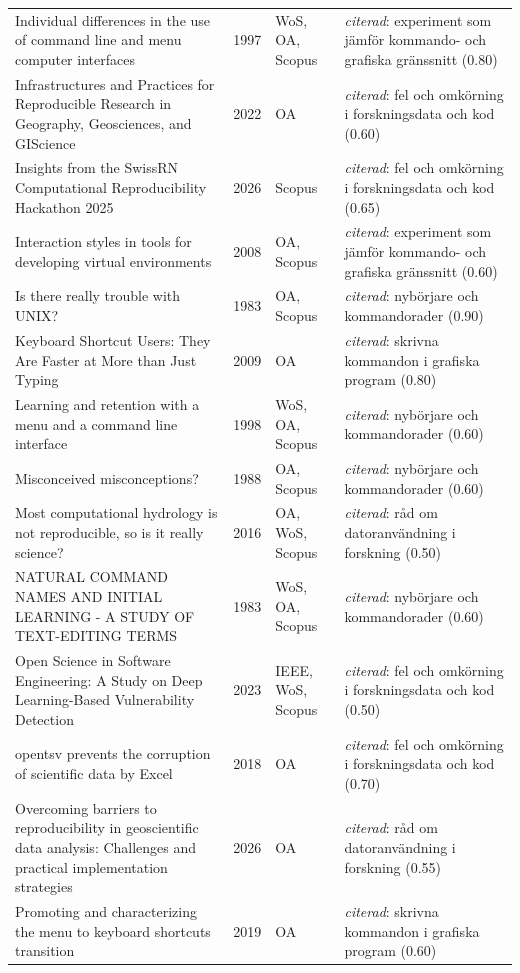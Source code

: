 \begin{longtable}{@{}%
  >{\raggedright\arraybackslash}p{}c%
  >{\raggedright\arraybackslash}p{}%
  >{\raggedright\arraybackslash}p{}@{}}
Individual differences in the use of command line and menu computer interfaces & 1997 & WoS, OA, Scopus & \emph{citerad}: experiment som jämför kommando- och grafiska gränssnitt (0.80) \\
Infrastructures and Practices for Reproducible Research in Geography, Geosciences, and GIScience & 2022 & OA & \emph{citerad}: fel och omkörning i forskningsdata och kod (0.60) \\
Insights from the SwissRN Computational Reproducibility Hackathon 2025 & 2026 & Scopus & \emph{citerad}: fel och omkörning i forskningsdata och kod (0.65) \\
Interaction styles in tools for developing virtual environments & 2008 & OA, Scopus & \emph{citerad}: experiment som jämför kommando- och grafiska gränssnitt (0.60) \\
Is there really trouble with UNIX? & 1983 & OA, Scopus & \emph{citerad}: nybörjare och kommandorader (0.90) \\
Keyboard Shortcut Users: They Are Faster at More than Just Typing & 2009 & OA & \emph{citerad}: skrivna kommandon i grafiska program (0.80) \\
Learning and retention with a menu and a command line interface & 1998 & WoS, OA, Scopus & \emph{citerad}: nybörjare och kommandorader (0.60) \\
Misconceived misconceptions? & 1988 & OA, Scopus & \emph{citerad}: nybörjare och kommandorader (0.60) \\
Most computational hydrology is not reproducible, so is it really science? & 2016 & OA, WoS, Scopus & \emph{citerad}: råd om datoranvändning i forskning (0.50) \\
NATURAL COMMAND NAMES AND INITIAL LEARNING - A STUDY OF TEXT-EDITING TERMS & 1983 & WoS, OA, Scopus & \emph{citerad}: nybörjare och kommandorader (0.60) \\
Open Science in Software Engineering: A Study on Deep Learning-Based Vulnerability Detection & 2023 & IEEE, WoS, Scopus & \emph{citerad}: fel och omkörning i forskningsdata och kod (0.50) \\
opentsv prevents the corruption of scientific data by Excel & 2018 & OA & \emph{citerad}: fel och omkörning i forskningsdata och kod (0.70) \\
Overcoming barriers to reproducibility in geoscientific data analysis: Challenges and practical implementation strategies & 2026 & OA & \emph{citerad}: råd om datoranvändning i forskning (0.55) \\
Promoting and characterizing the menu to keyboard shortcuts transition & 2019 & OA & \emph{citerad}: skrivna kommandon i grafiska program (0.60) \\

\end{longtable}
